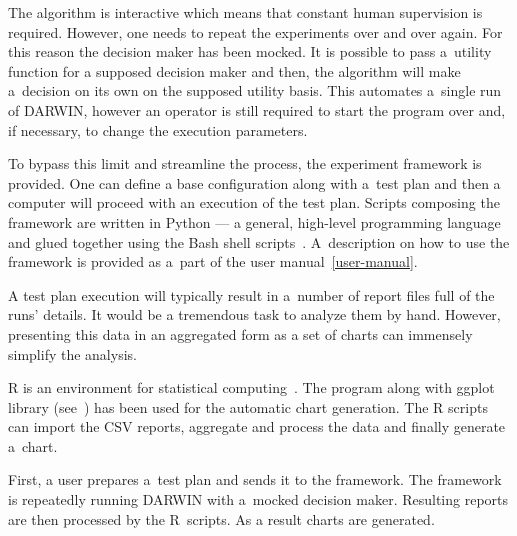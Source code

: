 The algorithm is interactive which means that constant human supervision is
required. However, one needs to repeat the experiments over and over
again. For this reason the decision maker has been mocked. It is possible to
pass a~utility function for a supposed decision maker and then, the algorithm
will make a~decision on its own on the supposed utility basis. This automates
a~single run of DARWIN, however an operator is still required to start the
program over and, if necessary, to change the execution parameters.

To bypass this limit and streamline the process, the experiment framework is
provided. One can define a base configuration along with a~test plan and then
a computer will proceed with an execution of the test plan. Scripts composing
the framework are written in Python --- a general, high-level programming
language~\cite{Pyt} and glued together using the Bash shell
scripts~\cite{Bas}. A~description on how to use the framework is provided as
a~part of the user manual~\ref{user-manual}.

A test plan execution will typically result in a~number of report files full
of the runs' details. It would be a tremendous task to analyze them by
hand. However, presenting this data in an aggregated form as a set of charts
can immensely simplify the analysis.

R is an environment for statistical computing~\cite{R}. The program along with
ggplot library (see~\cite{Wic09}) has been used for the automatic chart
generation. The R scripts can import the CSV reports, aggregate and process
the data and finally generate a~chart.

First, a user prepares a~test plan and sends it to the framework. The
framework is repeatedly running DARWIN with a~mocked decision maker. Resulting
reports are then processed by the R~scripts. As a result charts are generated.

